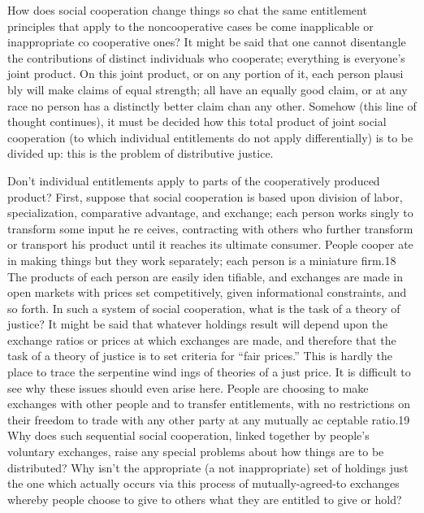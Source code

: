\documentclass[11pt,openany]{book}
\begin{document}
How does social cooperation change things so chat the same entitlement principles that apply to the noncooperative cases be come inapplicable or inappropriate co cooperative ones? It might be said that one cannot disentangle the contributions of distinct individuals who cooperate; everything is everyone's joint product. On this joint product, or on any portion of it, each person plausi bly will make claims of equal strength; all have an equally good claim, or at any race no person has a distinctly better claim chan any other. Somehow (this line of thought continues), it must be decided how this total product of joint social cooperation (to which individual entitlements do not apply differentially) is to be divided up: this is the problem of distributive justice. 

Don't individual entitlements apply to parts of the cooperatively produced product? First, suppose that social cooperation is based upon division of labor, specialization, comparative advantage, and exchange; each person works singly to transform some input he re ceives, contracting with others who further transform or transport his product until it reaches its ultimate consumer. People cooper ate in making things but they work separately; each person is a miniature firm.18 The products of each person are easily iden tifiable, and exchanges are made in open markets with prices set competitively, given informational constraints, and so forth. In such a system of social cooperation, what is the task of a theory of justice? It might be said that whatever holdings result will depend upon the exchange ratios or prices at which exchanges are made, and therefore that the task of a theory of justice is to set criteria for ``fair prices.'' This is hardly the place to trace the serpentine wind ings of theories of a just price. It is difficult to see why these issues should even arise here. People are choosing to make exchanges with other people and to transfer entitlements, with no restrictions on their freedom to trade with any other party at any mutually ac ceptable ratio.19 Why does such sequential social cooperation, linked together by people's voluntary exchanges, raise any special problems about how things are to be distributed? Why isn't the appropriate (a not inappropriate) set of holdings just the one which actually occurs via this process of mutually-agreed-to exchanges whereby people choose to give to others what they are entitled to give or hold? 
\end{document}
